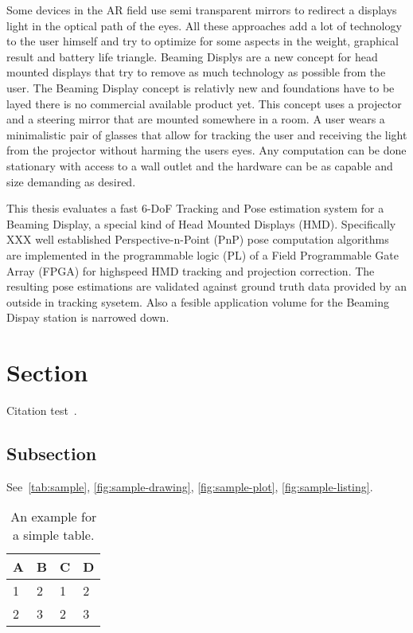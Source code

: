 Some devices in the AR field use semi transparent mirrors to redirect a displays light in the optical path of the eyes.
All these approaches add a lot of technology to the user himself and try to optimize for some aspects in the weight, graphical result and battery life triangle.
Beaming Displys are a new concept for head mounted displays that try to remove as much technology as possible from the user.
The Beaming Display concept is relativly new and foundations have to be layed there is no commercial available product yet.
This concept uses a projector and a steering mirror that are mounted somewhere in a room.
A user wears a minimalistic pair of glasses that allow for tracking the user and receiving the light from the projector without harming the users eyes.
Any computation can be done stationary with access to a wall outlet and the hardware can be as capable and size demanding as desired.



This thesis evaluates a fast 6-DoF Tracking and Pose estimation system for a Beaming Display, a special kind of Head Mounted Displays (HMD).
Specifically XXX well established Perspective-n-Point (PnP) pose computation algorithms are implemented in the programmable logic (PL) of a Field Programmable Gate Array (FPGA) for highspeed HMD tracking and projection correction.
The resulting pose estimations are validated against ground truth data provided by an outside in tracking sysetem.
Also a fesible application volume for the Beaming Dispay station is narrowed down.

\section{Section}
Citation test~\parencite{latex}.

\subsection{Subsection}



See~\autoref{tab:sample}, \autoref{fig:sample-drawing}, \autoref{fig:sample-plot}, \autoref{fig:sample-listing}.

\begin{table}[htpb]
  \caption[Example table]{An example for a simple table.}\label{tab:sample}
  \centering
  \begin{tabular}{l l l l}
    \toprule
      A & B & C & D \\
    \midrule
      1 & 2 & 1 & 2 \\
      2 & 3 & 2 & 3 \\
    \bottomrule
  \end{tabular}
\end{table}

